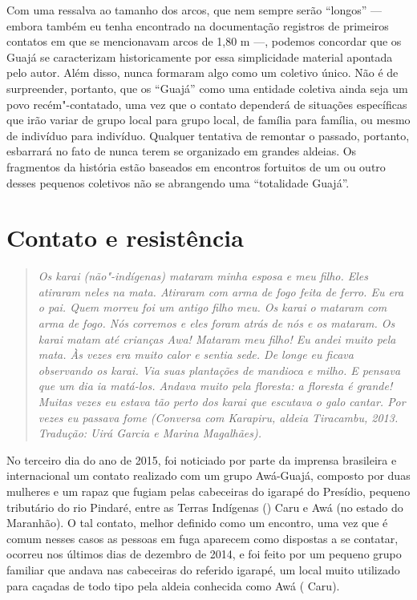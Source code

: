 Com uma ressalva ao tamanho dos arcos, que nem sempre serão ``longos'' ---
embora também eu tenha encontrado na documentação registros de primeiros
contatos em que se mencionavam arcos de 1,80 m ---, podemos concordar que
os Guajá se caracterizam historicamente por essa simplicidade material
apontada pelo autor. Além disso, nunca formaram algo como um coletivo
único. Não é de surpreender, portanto, que os ``Guajá'' como uma entidade
coletiva ainda seja um povo recém"-contatado, uma vez que o contato
dependerá de situações específicas que irão variar de grupo local para
grupo local, de família para família, ou mesmo de indivíduo para
indivíduo. Qualquer tentativa de remontar o passado, portanto, esbarrará
no fato de nunca terem se organizado em grandes aldeias. Os fragmentos
da história estão baseados em encontros fortuitos de um ou outro desses
pequenos coletivos não se abrangendo uma ``totalidade Guajá''.

\section{Contato e resistência}

\begin{quote}
\emph{Os karai (não"-indígenas) mataram minha esposa e meu filho. Eles
atiraram neles na mata. Atiraram com arma de fogo feita de ferro. Eu era
o pai. Quem morreu foi um antigo filho meu. Os karai o mataram com arma
de fogo. Nós corremos e eles foram atrás de nós e os mataram. Os karai
matam até crianças Awa! Mataram meu filho! Eu andei muito pela mata. Às
vezes era muito calor e sentia sede. De longe eu ficava observando os
karai. Via suas plantações de mandioca e milho. E pensava que um dia ia
matá-los. Andava muito pela floresta: a floresta é grande! Muitas vezes
eu estava tão perto dos karai que escutava o galo cantar. Por vezes eu
passava fome (Conversa com Karapiru, aldeia Tiracambu, 2013.
Tradução: Uirá Garcia e Marina Magalhães).}
\end{quote}

No terceiro dia do ano de 2015, foi noticiado por parte da imprensa
brasileira e internacional um contato realizado com um grupo Awá-Guajá,
composto por duas mulheres e um rapaz que fugiam pelas cabeceiras do
igarapé do Presídio, pequeno tributário do rio Pindaré, entre as Terras
Indígenas () Caru e Awá (no estado do Maranhão). O tal contato, melhor
definido como um encontro, uma vez que é comum nesses casos as
pessoas em fuga aparecem como dispostas a se contatar, ocorreu nos
últimos dias de dezembro de 2014, e foi feito por um pequeno grupo
familiar que andava nas cabeceiras do referido igarapé, um local muito
utilizado para caçadas de todo tipo pela aldeia conhecida como Awá (
Caru).

